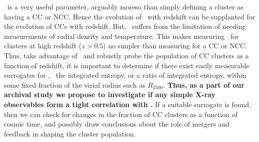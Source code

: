 \kna\ is a very useful parameter, arguably moreso than simply defining
a cluster as having a CC or NCC. Hence the evolution of \kna\ with
redshift can be supplanted for the evolution of CCs with
redshift. But, \kna\ suffers from the limitation of needing
measurements of radial density and temperature. This makes measuring
\kna\ for clusters at high redshift ($z > 0.5$) no simpler than
measuring for a CC or NCC. Thus, take advantage of \kna\ and robustly
probe the population of CC clusters as a function of redshift, it is
important to determine if there exist easily measurable surrogates for
\kna, \eg\ the integrated entropy, or a ratio of integrated entropy,
within some fixed fraction of the virial radius such as
$R_{2500}$. {\bf{Thus, as a part of our archival study we propose to
    investigate if any simple X-ray observables form a tight
    correlation with \kna.}} If a suitable surrogate is found, then we
can check for changes in the fraction of CC clusters as a function of
cosmic time, and possibly draw conclusions about the role of mergers
and feedback in shaping the cluster population.
